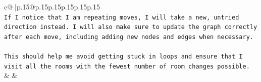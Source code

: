 \documentclass{article}
\begin{document}
{\begin{supertabular}{c@{$\;$}|p{.15\linewidth}@{}p{.15\linewidth}p{.15\linewidth}p{.15\linewidth}p{.15\linewidth}p{.15\linewidth}}
{{{\\ 
\texttt{If I notice that I am repeating moves, I will take a new, untried direction instead. I will also make sure to update the graph correctly after each move, including adding new nodes and edges when necessary. } \\
\\ 
\texttt{This should help me avoid getting stuck in loops and ensure that I visit all the rooms with the fewest number of room changes possible.} \\
            }
        }
    }
    & & \\ \\

\end{supertabular}
}
\end{document}
